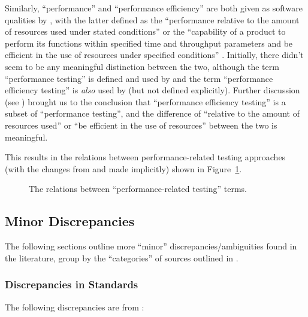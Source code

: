 Similarly, ``performance'' and ``performance efficiency'' are
both given as software qualities by \citeauthor{IEEE2017}, with the latter
defined as the ``performance relative to the amount
of resources used under stated conditions'' \citeyearpar[p.~319]{IEEE2017}
or the ``capability of a product to perform its functions within specified
time and throughput parameters and be efficient in the use of resources under
specified conditions'' \citep{ISO_IEC2023a}.
Initially, there didn't seem to be any meaningful distinction
between the two, although the term ``performance testing'' is defined
\citeyearpar[p.~320]{IEEE2017} and used by \citeauthor{IEEE2017} and
the term ``performance efficiency testing'' is \emph{also} used by
\citeauthor{IEEE2017} (but not defined explicitly). Further discussion (see
) brought us to the conclusion that ``performance
efficiency testing'' is a subset of ``performance testing'', and the
difference of ``relative to the amount of resources used'' or ``be efficient in
the use of resources'' between the two is meaningful.

This results in the relations between performance-related testing
approaches (with the changes from  and
 made implicitly) shown in Figure~\ref{fig:perf-graph}.

\begin{figure}[hbtp!]
      \centering
      \performanceGraph{}
      \caption{The relations between ``performance-related testing'' terms.}
      \label{fig:perf-graph}
\end{figure}

\subsection{Minor Discrepancies}
\label{minor-discrep}

The following sections outline more ``minor'' discrepancies/ambiguities found
in the literature, group by the ``categories'' of sources outlined in
.

\subsubsection{Discrepancies in Standards}

The following discrepancies are from \citep{IEEE2022, IEEE2021, IEEE2017,
      IEEE2013, IEEE2012, ISO_IEC2023a, ISO_IEC2023b, ISO_IEC2018,
      ISO2021, ISO2015}: %

